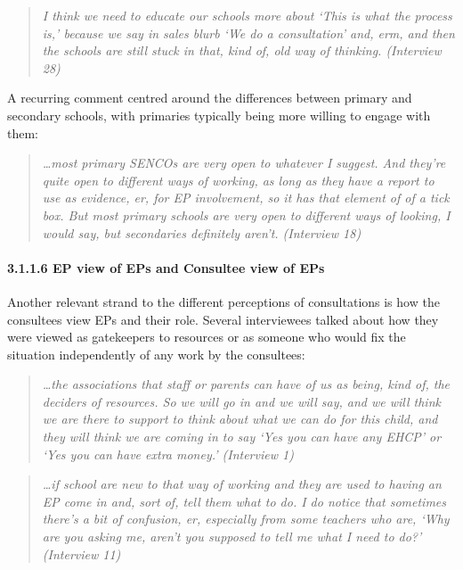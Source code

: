 \documentclass[
]{article}
\begin{document}
\begin{quote}
\emph{I think we need to educate our schools more about `This is what
the process is,' because we say in sales blurb `We do a consultation'
and, erm, and then the schools are still stuck in that, kind of, old way
of thinking. (Interview 28)}
\end{quote}

A recurring comment centred around the differences between primary and
secondary schools, with primaries typically being more willing to engage
with them:

\begin{quote}
\emph{\ldots most primary SENCOs are very open to whatever I suggest.
And they're quite open to different ways of working, as long as they
have a report to use as evidence, er, for EP involvement, so it has that
element of of a tick box. But most primary schools are very open to
different ways of looking, I would say, but secondaries definitely
aren't. (Interview 18)}
\end{quote}

\hypertarget{ep-view-of-eps-and-consultee-view-of-eps}{%
\paragraph{3.1.1.6 EP view of EPs and Consultee view of
EPs}\label{ep-view-of-eps-and-consultee-view-of-eps}}

Another relevant strand to the different perceptions of consultations is
how the consultees view EPs and their role. Several interviewees talked
about how they were viewed as gatekeepers to resources or as someone who
would fix the situation independently of any work by the consultees:

\begin{quote}
\emph{\ldots the associations that staff or parents can have of us as
being, kind of, the deciders of resources. So we will go in and we will
say, and we will think we are there to support to think about what we
can do for this child, and they will think we are coming in to say `Yes
you can have any EHCP' or `Yes you can have extra money.' (Interview 1)}
\end{quote}

\begin{quote}
\emph{\ldots if school are new to that way of working and they are used
to having an EP come in and, sort of, tell them what to do. I do notice
that sometimes there's a bit of confusion, er, especially from some
teachers who are, `Why are you asking me, aren't you supposed to tell me
what I need to do?' (Interview 11)}
\end{quote}
\end{document}
